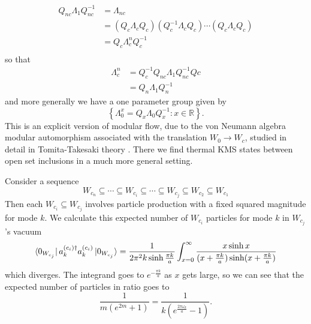 \documentclass[12pt,a4paper]{article}
\begin{document}
\begin{equation}
  \begin{array}{ll}    
    Q_{nc} \Lambda_1 Q_{nc}^{-1}  &= \Lambda_{nc} \\
         &= \left(Q_c \Lambda_{c} Q_c\right) \left( Q_c^{-1} \Lambda_{c} Q_c\right) \cdots \left(Q_c \Lambda_{c} Q_c\right) \\
  &= Q_c \Lambda_c^n Q_c^{-1} \\
  \end{array}
\end{equation}
so that
\begin{equation}
  \begin{array}{ll}
  \Lambda_c^n &= Q_c^{-1} Q_{nc} \Lambda_1 Q_{nc}^{-1} Q{c} \\
  &= Q_n \Lambda_1 Q_n^{-1}
  \end{array}
\end{equation}
and more generally we have a one parameter group given by
\begin{equation}
  \left\{\Lambda_0^x = Q_x \Lambda_0 Q_x^{-1} : x \in \mathbb{R} \right\}.
\end{equation}
This is an explicit version of modular flow, due to the von Neumann algebra modular automorphism associated with the translation $W_0 \rightarrow W_c$, studied in detail in Tomita-Takesaki theory \cite{Borchers2000}.  There we find thermal KMS states between open set inclusions in a much more general setting.


Consider a sequence
\begin{equation}
  W_{c_n} \subseteq \cdots \subseteq W_{c_i} \subseteq \cdots \subseteq W_{c_j} \subseteq W_{c_2} \subseteq W_{c_1}
\end{equation}
Then each $W_{c_i} \subseteq W_{c_j}$ involves particle production with a fixed squared magnitude for mode $k$.  We calculate this expected number of $W_{c_i}$ particles for mode $k$ in $W_{c_j}$'s vacuum
\begin{equation}
  \bra{0_{W_{c_j}}} a^{(c_i)\dagger}_k a^{(c_i)}_k \ket{0_{W_{c_j}}} = \frac{1}{2 \pi^2 k \sinh \frac{\pi k}{a}} \int_{x=0}^\infty \frac{x \sinh x}{(x+\frac{\pi k}{a}) \sinh(x+\frac{\pi k}{a})}
\end{equation}
which diverges.  The integrand goes to $e^{-\frac{\pi k}{a}}$ as $x$ gets large, so we can see that the expected number of particles in ratio goes to
\begin{equation}
  \frac{1}{m (e^{2m} + 1)} = \frac{1}{k (e^{\frac{2\pi \omega_k}{a}} - 1)}.
\end{equation}
\end{document}
